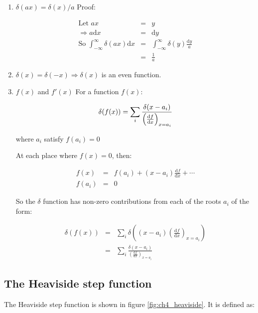 \begin{enumerate}
\item$\delta(ax) = \delta(x)/a$ Proof:

\begin{eqnarray*}
  \textrm{Let } ax & = & y \\
  \Rightarrow a\mathrm{d}x & = & \mathrm{d} y \\
  \textrm{So } \int_{-\infty}^{\infty}\delta(ax)\mathrm{d}x & = & \int_{-\infty}^{\infty} \delta(y)\frac{\mathrm{d}y}{a} \\
  & = & \frac{1}{a}
\end{eqnarray*}

\item $\delta(x) = \delta(-x) \Rightarrow \delta(x)$ is an even function.

\item$f(x)$ and $f'(x)$  For a function $f(x)$:

\[
  \delta(f(x)) = \displaystyle\sum_i \frac{\delta(x-a_i)}{\left(\frac{\mathrm{d}f}{\mathrm{d}x}\right)_{x=a_i}} \\
\]

where $a_i$ satisfy $f(a_i) = 0$
  
At each place where $f(x) = 0$, then:

\begin{eqnarray*}
  f(x) & = & f(a_i) + (x - a_i)\frac{\mathrm{d}f}{\mathrm{d}x} + \cdots \\
  f(a_i) & = & 0
\end{eqnarray*}

So the $\delta$ function has non-zero contributions from each of the roots $a_i$ of the form:

\begin{eqnarray*}
  \delta(f(x)) & = & \displaystyle\sum_i \delta \left( (x-a_i) \left(\frac{\mathrm{d}f}{\mathrm{d}x}\right)_{x=a_i}\right) \\
  & = & \displaystyle\sum_i \frac{\delta(x-a_i)}{\left(\frac{\mathrm{d}f}{\mathrm{d}x}\right)_{x=a_i}}
\end{eqnarray*}
\end{enumerate}

\subsection{The Heaviside step function}

The Heaviside step function is shown in figure \ref{fig:ch4_heaviside}.  It is defined as:

